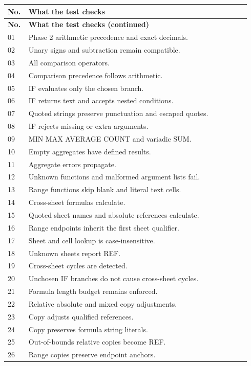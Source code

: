 \documentclass[11pt,letterpaper]{article}
\begin{document}
\begin{longtable}{@{}P{0.07\linewidth}P{0.87\linewidth}@{}}
\toprule\textbf{No.} & \textbf{What the test checks}\\\midrule\endfirsthead
\toprule\textbf{No.} & \textbf{What the test checks (continued)}\\\midrule\endhead
01 & Phase 2 arithmetic precedence and exact decimals.\\
02 & Unary signs and subtraction remain compatible.\\
03 & All comparison operators.\\
04 & Comparison precedence follows arithmetic.\\
05 & IF evaluates only the chosen branch.\\
06 & IF returns text and accepts nested conditions.\\
07 & Quoted strings preserve punctuation and escaped quotes.\\
08 & IF rejects missing or extra arguments.\\
09 & MIN MAX AVERAGE COUNT and variadic SUM.\\
10 & Empty aggregates have defined results.\\
11 & Aggregate errors propagate.\\
12 & Unknown functions and malformed argument lists fail.\\
13 & Range functions skip blank and literal text cells.\\
14 & Cross-sheet formulas calculate.\\
15 & Quoted sheet names and absolute references calculate.\\
16 & Range endpoints inherit the first sheet qualifier.\\
17 & Sheet and cell lookup is case-insensitive.\\
18 & Unknown sheets report REF.\\
19 & Cross-sheet cycles are detected.\\
20 & Unchosen IF branches do not cause cross-sheet cycles.\\
21 & Formula length budget remains enforced.\\
22 & Relative absolute and mixed copy adjustments.\\
23 & Copy adjusts qualified references.\\
24 & Copy preserves formula string literals.\\
25 & Out-of-bounds relative copies become REF.\\
26 & Range copies preserve endpoint anchors.\\

\end{longtable}
\end{document}
